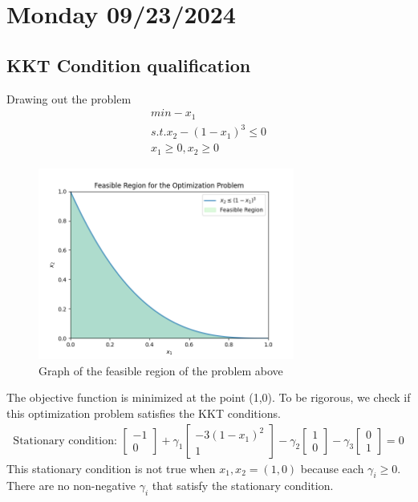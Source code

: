 \section{Monday 09/23/2024}

\subsection{KKT Condition qualification}
Drawing out the problem
\begin{equation}
  \begin{aligned}
    min -x_1 \\
    s.t. x_2 - (1-x_1)^3 \leq 0 \\
    x_1 \geq 0, x_2 \geq 0 
  \end{aligned}
\end{equation}

\begin{figure}[htbp]
  \centerline{\includegraphics[width=0.75\textwidth]{images/kkt_feasible_region.png}}
  \caption{Graph of the feasible region of the problem above}
  \label{fig:kkt_feasible_region}
\end{figure}

The objective function is minimized at the point (1,0). To be rigorous, we check if this optimization problem satisfies the KKT conditions.
\begin{align}
  \text{Stationary condition: }
  \begin{bmatrix}
     -1 \\
     0
  \end{bmatrix}
  + 
  \gamma_1
  \begin{bmatrix}
    -3(1-x_1)^2\\
    1
 \end{bmatrix}
 -
 \gamma_2
 \begin{bmatrix}
  1 \\
  0
 \end{bmatrix}
 -
 \gamma_3
 \begin{bmatrix}
  0 \\
  1
 \end{bmatrix}
 = 0
\end{align}
This stationary condition is not true when $x_1, x_2 = (1,0)$ because each $\gamma_i \geq 0$. There are no non-negative $\gamma_i$ that satisfy the stationary condition.  
\\ \\
